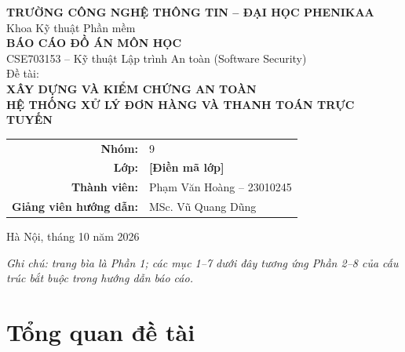 \documentclass[12pt,a4paper]{article}
\newcommand{\mustfill}[1]{\textcolor{secondary}{\textbf{[#1]}}}
\begin{document}
\begin{titlepage}
\thispagestyle{empty}
\begin{center}
{\large\bfseries TRƯỜNG CÔNG NGHỆ THÔNG TIN -- ĐẠI HỌC PHENIKAA}\\[2pt]
{\normalsize Khoa Kỹ thuật Phần mềm}\\[28pt]

{\Large\bfseries BÁO CÁO ĐỒ ÁN MÔN HỌC}\\[8pt]
{\large CSE703153 -- Kỹ thuật Lập trình An toàn (Software Security)}\\[28pt]

{\normalsize Đề tài:}\\[6pt]
{\Large\bfseries\color{primary} XÂY DỰNG VÀ KIỂM CHỨNG AN TOÀN\\[3pt]
HỆ THỐNG XỬ LÝ ĐƠN HÀNG VÀ THANH TOÁN TRỰC TUYẾN}\\[26pt]

\begin{tabular}{rl}
\textbf{Nhóm:} & 9 \\
\textbf{Lớp:} & \mustfill{Điền mã lớp} \\
\textbf{Thành viên:} & Phạm Văn Hoàng -- 23010245 \\
\textbf{Giảng viên hướng dẫn:} & MSc. Vũ Quang Dũng \\
\end{tabular}

\vfill
{\normalsize Hà Nội, tháng 10 năm 2026}
\end{center}
\end{titlepage}

\tableofcontents
\vspace{8pt}
\noindent\emph{Ghi chú: trang bìa là Phần 1; các mục 1--7 dưới đây tương ứng
Phần 2--8 của cấu trúc bắt buộc trong hướng dẫn báo cáo.}
\clearpage

\section{Tổng quan đề tài}
\end{document}
